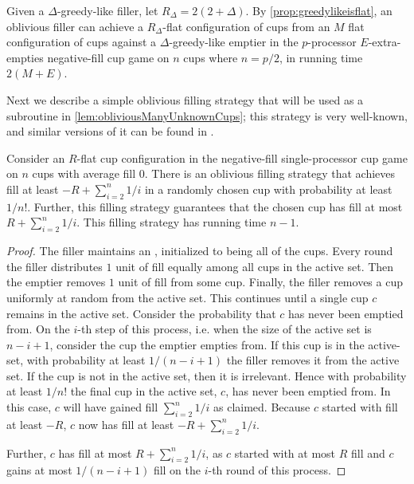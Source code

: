 Given a $\Delta$-greedy-like filler, let $R_\Delta = 2(2+\Delta).$
By \cref{prop:greedylikeisflat}, an oblivious filler can achieve
a $R_\Delta$-flat configuration of cups from an $M$ flat
configuration of cups against a $\Delta$-greedy-like emptier in
the $p$-processor $E$-extra-empties negative-fill cup game on
$n$ cups where $n = p/2$, in running time $2(M + E)$.


Next we describe a simple oblivious filling strategy that will be used as a
subroutine in \cref{lem:obliviousManyUnknownCups}; this strategy is very
well-known, and similar versions of it can be found in
\cite{ mbe19, mbe15, die91, wku20}.
\begin{proposition}
  \label{prop:obliviousTerribleProbability}
  Consider an $R$-flat cup configuration in the negative-fill
  single-processor cup game on $n$ cups with average fill $0$.
  There is an oblivious filling strategy that
  achieves fill at least $-R + \sum_{i=2}^{n} 1/i$ in a randomly chosen
  cup with probability at least $1/n!$. Further, this filling strategy
  guarantees that the chosen cup has fill at most $R +
  \sum_{i=2}^{n} 1/i$. This filling strategy
  has running time $n-1$.
\end{proposition}
\begin{proof}
  The filler maintains an , initialized to being
  all of the cups. Every round the filler distributes $1$ unit of
  fill equally among all cups in the active set. Then the emptier
  removes $1$ unit of fill from some cup. Finally, the filler
  removes a cup uniformly at random from the active set. This
  continues until a single cup $c$ remains in the active set. 
  Consider the probability that $c$ has never been emptied
  from. On the $i$-th step of this process, i.e. when the size of
  the active set is $n-i+1$, consider the cup the emptier empties
  from. If this cup is in the active-set, with probability at
  least $1/(n-i+1)$ the filler removes it from the active set.
  If the cup is not in the active set, then it is irrelevant.
  Hence with probability at least $1/n!$ the final
  cup in the active set, $c$, has never been emptied from.
  In this case, $c$ will have gained fill $\sum_{i=2}^n 1/i$
  as claimed. Because $c$ started with fill at
  least $-R$, $c$ now has fill at least $-R+ \sum_{i=2}^n 1/i$. 

  Further, $c$ has fill at most $R + \sum_{i=2}^n 1/i$, as $c$
  started with at most $R$ fill and $c$ gains at most $1/(n-i+1)$ fill
  on the $i$-th round of this process.
\end{proof}

